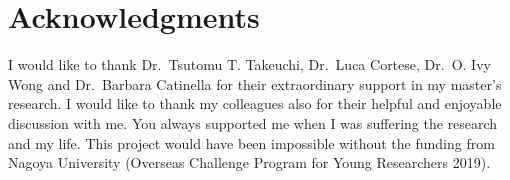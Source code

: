 \chapter*{\Large Acknowledgments}

I would like to thank Dr.\ Tsutomu T. Takeuchi, Dr.\ Luca Cortese, Dr.\ O. Ivy Wong and Dr.\ Barbara Catinella for their extraordinary support in my master's research.
I would like to thank my colleagues also for their helpful and enjoyable discussion with me.
You always supported me when I was suffering the research and my life.
This project would have been impossible without the funding from Nagoya University (Overseas Challenge Program for Young Researchers 2019).
